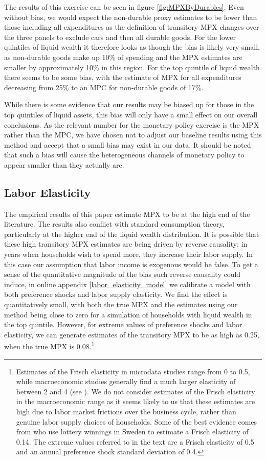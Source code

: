 \documentclass[titlepage]{\econtex}\newcommand{\texname}{ConsumptionHeterogeneity}
\begin{document}
The results of this exercise can be seen in figure \ref{fig:MPXByDurables}. Even without bias, we would expect the non-durable proxy estimates to be lower than those including all expenditures as the definition of transitory MPX changes over the three panels to exclude cars and then all durable goods. For the lower quintiles of liquid wealth it therefore looks as though the bias is likely very small, as non-durable goods make up 10\% of spending and the MPX estimates are smaller by approximately 10\% in this region. For the top quintile of liquid wealth there seems to be some bias, with the estimate of MPX for all expenditures decreasing from 25\% to an MPC for non-durable goods of 17\%.

While there is some evidence that our results may be biased up for those in the top quintiles of liquid assets, this bias will only have a small effect on our overall conclusions. As the relevant number for the monetary policy exercise is the MPX rather than the MPC, we have chosen not to adjust our baseline results using this method and accept that a small bias may exist in our data. It should be noted that such a bias will cause the heterogeneous channels of monetary policy to appear smaller than they actually are.

\subsection{Labor Elasticity} \label{labor_elasticity}
The empirical results of this paper estimate MPX to be at the high end of the literature. The results also conflict with standard consumption theory, particularly at the higher end of the liquid wealth distribution. It is possible that these high transitory MPX estimates are being driven by reverse causality: in years when households wish to spend more, they increase their labor supply. In this case our assumption that labor income is exogenous would be false. To get a sense of the quantitative magnitude of the bias such reverse causality could induce, in online appendix \ref{labor_elasticity_model} we calibrate a model with both preference shocks and labor supply elasticity. We find the effect is quantitatively small, with both the true MPX and the estimates using our method being close to zero for a simulation of households with liquid wealth in the top quintile. However, for extreme values of preference shocks and labor elasticity, we can generate estimates of the transitory MPX to be as high as 0.25, when the true MPX is 0.08.\footnote{Estimates of the Frisch elasticity in microdata studies range from 0 to 0.5, while macroeconomic studies generally find a much larger elasticity of between 2 and 4 (see \cite{peterman_reconciling_2016}). We do not consider estimates of the Frisch elasticity in the macroeconomic range as it seems likely to us that these estimates are high due to labor market frictions over the business cycle, rather than genuine labor supply choices of households. Some of the best evidence comes from \cite{cesarini_effect_2017} who use lottery winnings in Sweden to estimate a Frisch elasticity of 0.14. The extreme values referred to in the text are a Frisch elasticity of 0.5 and an annual preference shock standard deviation of 0.4.}
\end{document}
